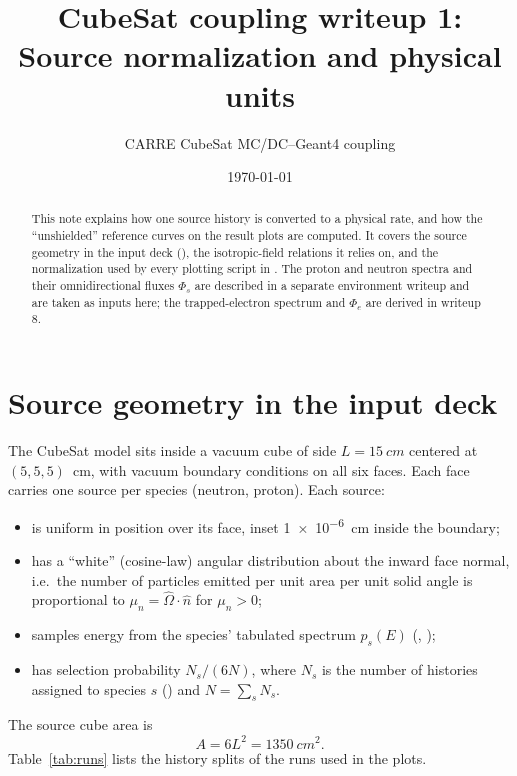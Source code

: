 

\title{CubeSat coupling writeup 1:\\Source normalization and physical units}
\author{CARRE CubeSat MC/DC--Geant4 coupling}
\date{\today}


\maketitle

\begin{abstract}
This note explains how one \mcdc{} source history is converted to a physical rate, and how the ``unshielded'' reference curves on the result plots are computed. It covers the source geometry in the input deck (), the isotropic-field relations it relies on, and the normalization used by every plotting script in . The proton and neutron spectra and their omnidirectional fluxes $\Phi_s$ are described in a separate environment writeup and are taken as inputs here; the trapped-electron spectrum and $\Phi_e$ are derived in writeup 8.
\end{abstract}

\section{Source geometry in the input deck}

The CubeSat model sits inside a vacuum cube of side $L = \SI{15}{cm}$ centered at $(5,5,5)$~cm, with vacuum boundary conditions on all six faces. Each face carries one source per species (neutron, proton). Each source:
\begin{itemize}
  \item is uniform in position over its face, inset \SI{1e-6}{cm} inside the boundary;
  \item has a ``white'' (cosine-law) angular distribution about the inward face normal, i.e.\ the number of particles emitted per unit area per unit solid angle is proportional to $\mu_n = \hat\Omega\cdot\hat n$ for $\mu_n>0$;
  \item samples energy from the species' tabulated spectrum $p_s(E)$ (, );
  \item has selection probability $N_s/(6N)$, where $N_s$ is the number of histories assigned to species $s$ () and $N=\sum_s N_s$.
\end{itemize}
The source cube area is
\begin{equation}
  A = 6L^2 = \SI{1350}{cm^2}.
\end{equation}
Table~\ref{tab:runs} lists the history splits of the runs used in the plots.

